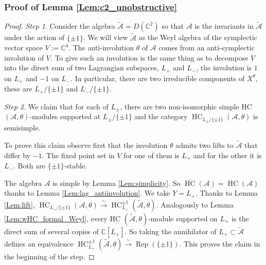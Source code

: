 \documentclass[12pt]{amsart}
\newcommand{\C}{\mathbb{C}}
\newcommand{\A}{\mathcal{A}}
\newcommand{\HC}{\operatorname{HC}}
\theoremstyle{definition}
\numberwithin{equation}{section}
\begin{document}
\subsubsection{Proof of Lemma \ref{Lem:c2_unobstructive}}
\begin{proof}
{\it Step 1}.
Consider the algebra $\tilde{\A}=D(\C^2)$ so that $\A$ is the invariants in $\tilde{\A}$
under the action of $\{\pm 1\}$. We will view $\tilde{\A}$ as the Weyl algebra
of the symplectic vector space $V:=\C^4$. The anti-involution $\theta$ of $\A$
comes from an anti-symplectic involution of $V$. To give such an involution is the
same thing as to decompose $V$ into the direct sum of two Lagrangian subspaces,
$L_+$ and $L_-$, the involution is $1$ on $L_+$ and $-1$ on $L_-$. In particular,
there are two irreducible components of $X^\theta$, these are $L_+/\{\pm 1\}$
and $L_-/\{\pm 1\}$.

{\it Step 2}. We claim that for each of $L_{\pm}$, there are two
non-isomorphic simple HC $(\A,\theta)$-modules supported at $L_\pm/\{\pm 1\}$ and the category
$\HC_{L_{\pm}/\{\pm 1\}}(\A,\theta)$ is semisimple.

To prove this claim observe first that
the involution $\theta$ admits two lifts to $\tilde{\A}$ that differ by
$-1$. The fixed point set in $V$ for one of them is $L_+$ and for the
other it is $L_-$. Both are $\{\pm 1\}$-stable.

The algebra $\A$ is simple by Lemma \ref{Lem:simplicity}. So $\bar{\HC}(\A)=\HC(\A)$
thanks to Lemma \ref{Lem:lag_antiinvolution}.
We take $Y=L_+$.
Thanks to Lemma \ref{Lem:lift}, $\HC_{L_{+}/\{\pm 1\}}(\A,\theta)\xrightarrow{\sim}
\HC^{\pm 1}_{L_+}(\tilde{\A},\theta)$. Analogously to Lemma \ref{Lem:wHC_formal_Weyl},
every HC $(\tilde{\A},\theta)$-module supported on $L_+$ is the direct sum of several copies of
$\C[L_+]$. So taking the annihilator of $L_+\subset \tilde{\A}$ defines an equivalence
$\HC^{\pm 1}_{L_+}(\tilde{\A},\theta)\xrightarrow{\sim} \operatorname{Rep}(\{\pm 1\})$.
This proves the claim in the beginning of the step.

\end{proof}
\end{document}
